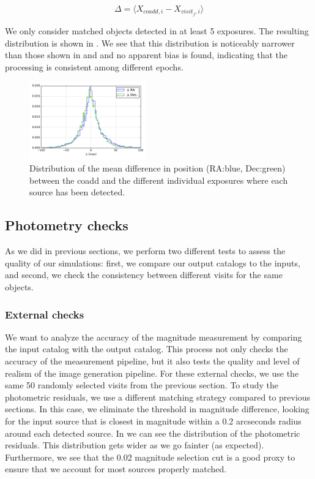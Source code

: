 \documentclass[twocolumn]{aastex62}
\begin{document}
\begin{equation}
  \Delta = \langle X_{coadd,i} - X_{visit_{j},i} \rangle
\end{equation}

We only consider matched objects detected in at least 5 exposures. The resulting distribution is shown in . We see that this distribution is noticeably narrower than those shown in  and  and no apparent bias is found, indicating that the processing is consistent among different epochs.

\begin{figure}
  \centering
  \includegraphics[width=0.45\textwidth]{astrometry_internal_10visits_imsim_undithered}
  \caption{Distribution of the mean difference in position (RA:blue, Dec:green) between the coadd and the different individual exposures
  where each source has been detected.}
  \label{fig:astrometry_internal}
\end{figure}

\subsection{Photometry checks}
\label{sec:photometry_checks}

As we did in previous sections, we perform two different tests to assess the quality of our simulations: first, we compare our output catalogs to the inputs, and second, we check the consistency between different visits for the same objects.

\subsubsection{External checks}
\label{sec:external_photometry}

We want to analyze the accuracy of the magnitude measurement by comparing the input catalog with the output catalog. This process not only checks
the accuracy of the measurement pipeline, but it also tests the quality and level of realism of the image generation pipeline.
For these external checks, we use the same 50 randomly selected visits from the previous section.
To study the photometric residuals, we use a different matching strategy compared to previous sections. In this case, we eliminate the threshold
in magnitude difference, looking for the input source that is closest in magnitude within a 0.2 arcseconds radius around each detected
source. In  we can see the distribution of the photometric residuals. This distribution gets wider as we go
fainter (as expected). Furthermore, we see that the 0.02 magnitude selection cut is a good proxy to ensure that we account for most sources properly matched.
\end{document}
